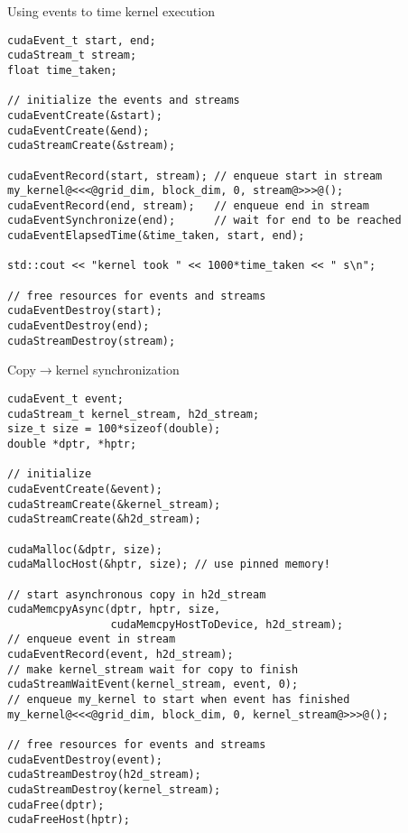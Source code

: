 \documentclass[aspectratio=43]{beamer}
\begin{document}
\begin{frame}[fragile]{}
    \begin{code}{Using events to time kernel execution}
        \begin{lstlisting}[style=boxcudatiny]
cudaEvent_t start, end;
cudaStream_t stream;
float time_taken;

// initialize the events and streams
cudaEventCreate(&start);
cudaEventCreate(&end);
cudaStreamCreate(&stream);

cudaEventRecord(start, stream); // enqueue start in stream
my_kernel@<<<@grid_dim, block_dim, 0, stream@>>>@();
cudaEventRecord(end, stream);   // enqueue end in stream
cudaEventSynchronize(end);      // wait for end to be reached
cudaEventElapsedTime(&time_taken, start, end);

std::cout << "kernel took " << 1000*time_taken << " s\n";

// free resources for events and streams
cudaEventDestroy(start);
cudaEventDestroy(end);
cudaStreamDestroy(stream);
        \end{lstlisting}
    \end{code}
\end{frame}

\begin{frame}[fragile]{}
    \begin{code}{Copy$\rightarrow$kernel synchronization}
        \begin{lstlisting}[style=boxcudatiny]
cudaEvent_t event;
cudaStream_t kernel_stream, h2d_stream;
size_t size = 100*sizeof(double);
double *dptr, *hptr;

// initialize
cudaEventCreate(&event);
cudaStreamCreate(&kernel_stream);
cudaStreamCreate(&h2d_stream);

cudaMalloc(&dptr, size);
cudaMallocHost(&hptr, size); // use pinned memory!

// start asynchronous copy in h2d_stream
cudaMemcpyAsync(dptr, hptr, size,
                cudaMemcpyHostToDevice, h2d_stream);
// enqueue event in stream
cudaEventRecord(event, h2d_stream);
// make kernel_stream wait for copy to finish
cudaStreamWaitEvent(kernel_stream, event, 0);
// enqueue my_kernel to start when event has finished
my_kernel@<<<@grid_dim, block_dim, 0, kernel_stream@>>>@();

// free resources for events and streams
cudaEventDestroy(event);
cudaStreamDestroy(h2d_stream);
cudaStreamDestroy(kernel_stream);
cudaFree(dptr);
cudaFreeHost(hptr);
        \end{lstlisting}
    \end{code}
\end{frame}
\end{document}
